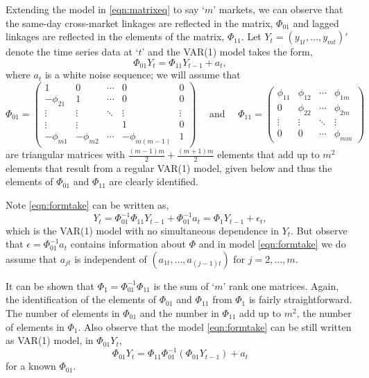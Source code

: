Extending the model in \eqref{eqn:matrixeq} to say `$m$' markets, we can observe that the same-day cross-market linkages are reflected in the matrix, $\Phi_{01}$ and lagged linkages are reflected in the elements of the matrix, $\Phi_{11}$. Let $Y_t = (y_{1t} ,\ldots, y_{mt})'$ denote the time series data at `$t$' and the VAR(1) model takes the form,
	\begin{equation}\label{eqn:formtake}
	\Phi_{01} Y_t= \Phi_{11} Y_{t-1} + a_t,
	\end{equation}
where $a_t$ is a white noise sequence; we will assume that
	\[
	\Phi_{01}= \begin{pmatrix} 
	1 & 0 & \cdots & 0 & 0 \\
	-\phi_{21} &  1 & \cdots & 0 & 0 \\
	\vdots & \vdots &  \ddots & \vdots & \vdots \\
	\vdots & \vdots & & 1  & 0 \\
	-\phi_{m1} & -\phi_{m2} & \cdots & -\phi_{m(m-1)} &  1 
	\end{pmatrix} \quad \text{ and } \quad
	\Phi_{11}= \begin{pmatrix}
	\phi_{11} &  \phi_{12} &  \cdots & \phi_{1m} \\
	0 & \phi_{22} & \cdots & \phi_{2m} \\
	\vdots & \vdots & \ddots & \vdots \\
	0 & 0 & \cdots & \phi_{mm} 
	\end{pmatrix}
	\]
are triangular matrices with $\frac{(m-1)m}{2}+ \frac{(m+1)m}{2}$ elements that add up to $m^2$ elements that result from a regular VAR(1) model, given below and thus the elements of $\Phi_{01}$
and $\Phi_{11}$ are clearly identified. 


Note \eqref{eqn:formtake} can be written as,
	\begin{equation} \label{eqn:rewrittenas}
	Y_t= \Phi_{01}^{-1} \Phi_{11} Y_{t-1} + \Phi_{01}^{-1} a_t = \Phi_1 Y_{t-1} + \epsilon_t,
	\end{equation}
which is the VAR(1) model with no simultaneous dependence in $Y_t$. But observe that $\epsilon= \Phi_{01}^{-1} a_t$ contains information about $\Phi$ and in model \eqref{eqn:formtake} we do assume that  $a_{jt}$ is independent of $(a_{1t},\ldots, a_{(j-1)t})$ for $j = 2,\ldots,m$.


It can be shown that $\Phi_1= \Phi_{01}^{-1} \Phi_{11}$ is the sum of `$m$' rank one matrices. Again, the identification of the elements of $\Phi_{01}$ and $\Phi_{11}$ from $\Phi_1$ is fairly straightforward. The number of elements in $\Phi_{01}$ and the number in $\Phi_{11}$ add up to $m^2$, the number of elements in $\Phi_1$. Also observe that the model \eqref{eqn:formtake} can be still written as VAR(1) model, in $\Phi_{01} Y_t$,
	\begin{equation}\label{eqn:var1phimod}
	\Phi_{01} Y_t = \Phi_{11} \Phi_{01}^{-1} ( \Phi_{01} Y_{t-1}) + a_t
	\end{equation}
for a known $\Phi_{01}$.


